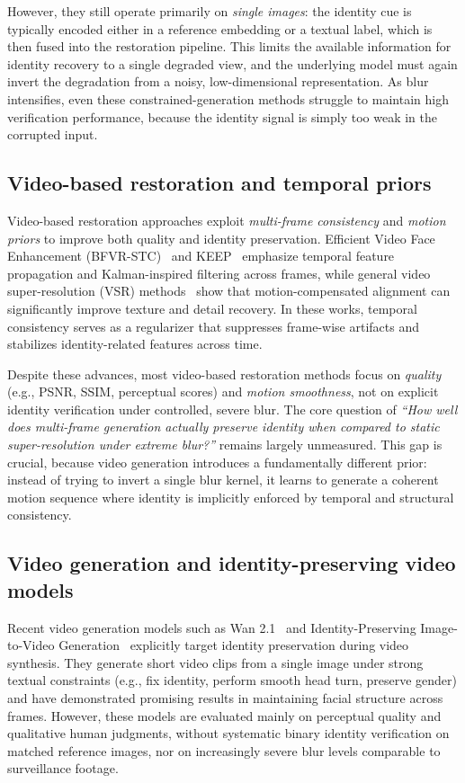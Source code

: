\documentclass{ieeeaccess}
\begin{document}
However, they still operate primarily on \emph{single images}: the identity cue is typically encoded either in a reference embedding or a textual label, which is then fused into the restoration pipeline. This limits the available information for identity recovery to a single degraded view, and the underlying model must again invert the degradation from a noisy, low-dimensional representation. As blur intensifies, even these constrained-generation methods struggle to maintain high verification performance, because the identity signal is simply too weak in the corrupted input.

\subsection{Video-based restoration and temporal priors}
Video-based restoration approaches exploit \emph{multi-frame consistency} and \emph{motion priors} to improve both quality and identity preservation. Efficient Video Face Enhancement (BFVR-STC)~\cite{BFVR-STC} and KEEP~\cite{KEEP} emphasize temporal feature propagation and Kalman-inspired filtering across frames, while general video super-resolution (VSR) methods~\cite{VSR_survey} show that motion-compensated alignment can significantly improve texture and detail recovery. In these works, temporal consistency serves as a regularizer that suppresses frame-wise artifacts and stabilizes identity-related features across time.

Despite these advances, most video-based restoration methods focus on \emph{quality} (e.g., PSNR, SSIM, perceptual scores) and \emph{motion smoothness}, not on explicit identity verification under controlled, severe blur. The core question of \emph{``How well does multi-frame generation actually preserve identity when compared to static super-resolution under extreme blur?''} remains largely unmeasured. This gap is crucial, because video generation introduces a fundamentally different prior: instead of trying to invert a single blur kernel, it learns to generate a coherent motion sequence where identity is implicitly enforced by temporal and structural consistency.

\subsection{Video generation and identity-preserving video models}
Recent video generation models such as Wan 2.1~\cite{Wan2_1} and Identity-Preserving Image-to-Video Generation~\cite{IdentityPreservingVideo} explicitly target identity preservation during video synthesis. They generate short video clips from a single image under strong textual constraints (e.g., fix identity, perform smooth head turn, preserve gender) and have demonstrated promising results in maintaining facial structure across frames. However, these models are evaluated mainly on perceptual quality and qualitative human judgments, without systematic binary identity verification on matched reference images, nor on increasingly severe blur levels comparable to surveillance footage.
\end{document}
